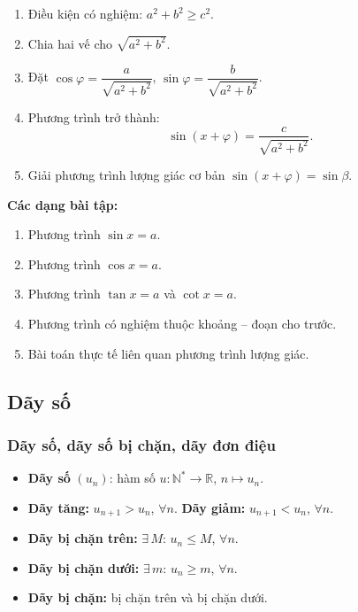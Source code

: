 \documentclass[12pt,a4paper]{article}
\begin{document}
\begin{phuongphap}[title={Phương trình $a\sin x + b\cos x = c$}]
  \begin{enumerate}
    \item Điều kiện có nghiệm: $a^2 + b^2 \ge c^2$.
    \item Chia hai vế cho $\sqrt{a^2 + b^2}$.
    \item Đặt $\cos\varphi = \dfrac{a}{\sqrt{a^2 + b^2}}$, \;$\sin\varphi = \dfrac{b}{\sqrt{a^2 + b^2}}$.
    \item Phương trình trở thành:
      \[
        \sin(x + \varphi) = \dfrac{c}{\sqrt{a^2 + b^2}}.
      \]
    \item Giải phương trình lượng giác cơ bản $\sin(x + \varphi) = \sin\beta$.
  \end{enumerate}
\end{phuongphap}

\medskip\noindent\textbf{Các dạng bài tập:}
\begin{enumerate}[label=\textbf{Dạng \arabic*:}, leftmargin=*, align=left]
  \item Phương trình $\sin x = a$.
  \item Phương trình $\cos x = a$.
  \item Phương trình $\tan x = a$ và $\cot x = a$.
  \item Phương trình có nghiệm thuộc khoảng -- đoạn cho trước.
  \item Bài toán thực tế liên quan phương trình lượng giác.
\end{enumerate}

\subsection{Dãy số}

\subsubsection{Dãy số, dãy số bị chặn, dãy đơn điệu}

\begin{dinhnghia}
  \begin{itemize}
    \item \textbf{Dãy số} $(u_n)$: hàm số $u \colon \mathbb{N}^{*} \to \mathbb{R}$, \;$n \mapsto u_n$.
    \item \textbf{Dãy tăng:} $u_{n+1} > u_n$, $\forall n$. \quad
          \textbf{Dãy giảm:} $u_{n+1} < u_n$, $\forall n$.
    \item \textbf{Dãy bị chặn trên:} $\exists\, M$: \;$u_n \le M$, \;$\forall n$.
    \item \textbf{Dãy bị chặn dưới:} $\exists\, m$: \;$u_n \ge m$, \;$\forall n$.
    \item \textbf{Dãy bị chặn:} bị chặn trên và bị chặn dưới.
  \end{itemize}
\end{dinhnghia}
\end{document}
